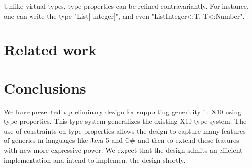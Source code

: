\documentclass[preprint,nocopyrightspace,9pt]{sigplanconf}
\begin{document}
Unlike virtual types, type properties can be refined contravariantly.
For instance, one can write the type \xcd"List[-Integer]",
and even \xcd"List{Integer<:T, T<:Number}".


\section{Related work}

\cite{unifying-genericity}
\cite{adding-wildcards}
\cite{emir06}
\cite{myers94}
\cite{polyj}
\cite{allen04}
\cite{allen03}
\cite{beta}
\cite{mp89-virtual-classes}
\cite{thorup97}

\section{Conclusions}

We have presented a preliminary design for supporting genericity
in X10 using type properties.  This type system generalizes the
existing X10 type system.  The use of constraints on type
properties allows
the design to capture many features of generics in languages
like Java 5 and C\# and then to extend these features with new
more expressive power.
We expect that the design admits an efficient
implementation and intend to implement the design shortly.

\newpage





% 
\end{document}
